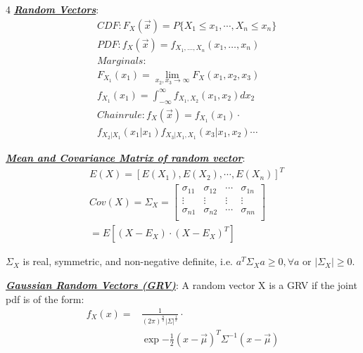 \documentclass[12pt]{article}
\newcommand{\bulletPoint}[1]{\ul{\textit{\textbf{#1}}}}
\begin{document}
\begin{multicols*}{4}
\bulletPoint{Random Vectors}:
\useshortskip \begin{equation*}
    \begin{split}
        & CDF: F_X(\Vec{x}) = P\{X_1 \leq x_1, \cdots, X_n \leq x_n\}\\
        & PDF: f_X(\Vec{x}) = f_{X_1, \ldots, X_n}(x_1, \ldots, x_n)\\
        & Marginals: \\
        & F_{X_1}(x_1) = \lim_{x_2, x_3 \rightarrow \infty}F_{X}(x_1, x_2, x_3)\\
        & f_{X_1}(x_1) = \int^\infty_{-\infty}f_{X_1,X_2}(x_1,x_2)dx_2\\
        & Chain rule: f_X(\Vec{x}) = f_{X_1}(x_1)\cdot\\
        & f_{X_2|X_1}(x_1|x_1)f_{X_3|X_1,X_1}(x_3|x_1, x_2)\cdots
    \end{split}
\end{equation*}



\bulletPoint{Mean and Covariance Matrix of random vector}:
\useshortskip\begin{equation*}
    \begin{split}
        & E(X) = [E(X_1), E(X_2), \cdots, E(X_n)]^T\\
        & Cov(X) = \Sigma_X = 
        \begin{bmatrix}
        \sigma_{11} & \sigma_{12} & \cdots & \sigma_{1n}\\
        \vdots & \vdots & \vdots & \vdots \\
        \sigma_{n1} & \sigma_{n2} & \cdots & \sigma_{nn}\\
        \end{bmatrix}\\
        & = E[(X-E_X)\cdot(X-E_X)^T]
    \end{split}
\end{equation*}

$\Sigma_X$ is real, symmetric, and non-negative definite, i.e. $a^T\Sigma_Xa \geq 0, \forall a$ or $|\Sigma_X| \geq 0$.


\bulletPoint{Gaussian Random Vectors (GRV)}:
A random vector X is a GRV if the joint pdf is of the form:
\useshortskip \begin{equation*}
    \begin{split}
        f_X(x) = & \frac{1}{(2\pi)^{\frac{n}{2}}|\Sigma|^{\frac{1}{2}}}\cdot\\
        & \exp{-\frac{1}{2}(x-\Vec{\mu})^T\Sigma^{-1}(x-\Vec{\mu})}
    \end{split}
\end{equation*}



\end{multicols*}
\end{document}
